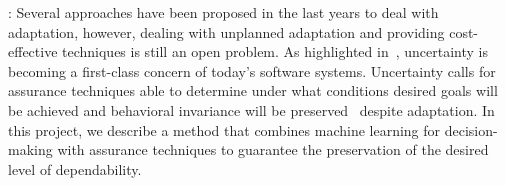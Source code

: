 \documentclass[12pt]{article}
\begin{document}
: 
Several approaches have been proposed in the last years to deal with adaptation, however, dealing with unplanned adaptation and providing cost-effective techniques is still an open problem.  As highlighted in~\cite{ACD11,G10,G12}, uncertainty is becoming a first-class concern of today's software systems. Uncertainty calls for assurance techniques %
able to determine under what conditions desired goals will be achieved and behavioral invariance will be preserved~\cite{ACD11,G10,G12} despite adaptation. 
In this project, we describe a method that combines machine learning for decision-making with assurance techniques to guarantee the preservation of the desired level of dependability. 
\end{document}
